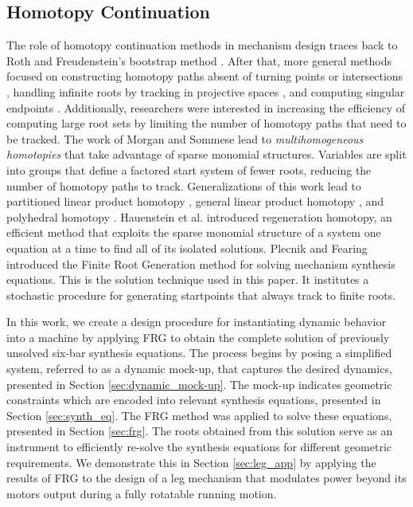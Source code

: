 \documentclass[journal]{IEEEtran}
\begin{document}
\subsection{Homotopy Continuation}
\label{sec:homotopy}

The role of homotopy continuation methods in mechanism design traces back to Roth and Freudenstein's bootstrap method \cite{rothSynthesisPathGeneratingMechanisms1963}. %
After that, more general methods focused on constructing homotopy paths absent of turning points or intersections \cite{zangwillPathwaysSolutionsFixed1981}, handling infinite roots by tracking in projective spaces \cite{wrightFindingAllSolutions1985}, and computing singular endpoints \cite{morganPowerSeriesMethod1992}. %
Additionally, researchers were interested in increasing the efficiency of computing large root sets by limiting the number of homotopy paths that need to be tracked. %
The work of Morgan and Sommese \cite{morganHomotopySolvingGeneral1987} lead to \emph{multihomogeneous homotopies} that take advantage of sparse monomial structures.  Variables are split into groups that define a factored start system of fewer roots, reducing the number of homotopy paths to track. %
Generalizations of this work lead to partitioned linear product homotopy \cite{verscheldeGBQAlgorithmConstructing1993,wiseAlgorithm801POLSYS2000}, general linear product homotopy \cite{verscheldeSymbolicHomotopyConstruction1993,verscheldeAlgorithm795PHCpack1999,suAlgorithm857POLSYS2006}, and polyhedral homotopy \cite{verscheldeHomotopiesExploitingNewton1994}. %
Hauenstein et al. \cite{hauensteinRegenerationHomotopiesSolving2011} introduced regeneration homotopy, an efficient method that exploits the sparse monomial structure of a system one equation at a time to find all of its isolated solutions. %
Plecnik and Fearing \cite{plecnikFindingOnlyFinite2017,plecnikStudyFindingFinite2017} introduced the Finite Root Generation method for solving mechanism synthesis equations.  
This is the solution technique used in this paper.  It institutes a stochastic procedure for generating startpoints that always track to finite roots.



In this work, we create a design procedure for instantiating dynamic behavior into a machine by applying FRG to obtain the complete solution of previously unsolved six-bar synthesis equations.
The process begins by posing a simplified system, referred to as a dynamic mock-up, that captures the desired dynamics, presented in Section \ref{sec:dynamic_mock-up}.
The mock-up indicates geometric constraints which are encoded into relevant synthesis equations, presented in Section \ref{sec:synth_eq}.
The FRG method was applied to solve these equations, presented in Section \ref{sec:frg}.
The roots obtained from this solution serve as an instrument to efficiently re-solve the synthesis equations for different geometric requirements.
We demonstrate this in Section \ref{sec:leg_app} by applying the results of FRG to the design of a leg mechanism that modulates power beyond its motors output during a fully rotatable running motion.
\end{document}
